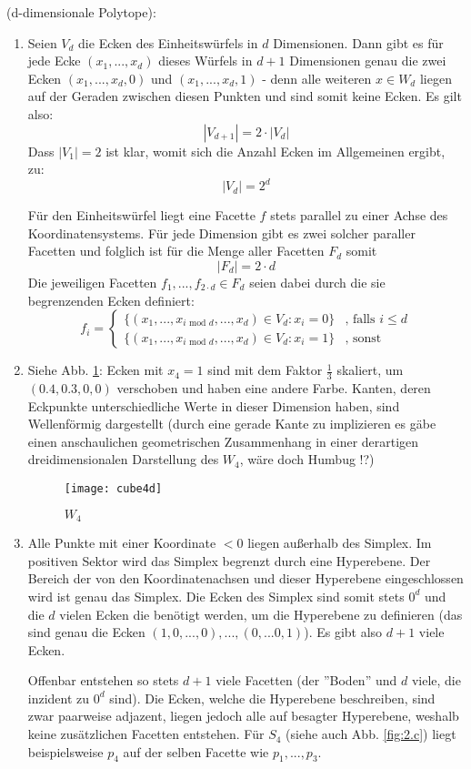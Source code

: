 \documentclass[a4paper, titlepage=false, parskip=full-, 10pt]{scrartcl}
\newcounter{tasknbr}
\newenvironment{task}[1]{{\bf Aufgabe \arabic {tasknbr}\stepcounter{tasknbr}} (#1):\begin{enumerate}}{\end{enumerate}}
\newcommand{\subtask}[1]{\item[#1)]}
\begin{document}
\begin{task}{d-dimensionale Polytope}
\subtask{a}
Seien $V_d$ die Ecken des Einheitswürfels in $d$ Dimensionen. Dann gibt es für jede Ecke $(x_1,...,x_d)$ dieses Würfels in $d+1$ Dimensionen genau die zwei Ecken $(x_1,...,x_d,0)$ und $(x_1,...,x_d,1)$ - denn alle weiteren $x\in W_d$ liegen auf der Geraden zwischen diesen Punkten und sind somit keine Ecken. Es gilt also:
$$|V_{d+1}|=2\cdot |V_d|$$
Dass $|V_1|=2$ ist klar, womit sich die Anzahl Ecken im Allgemeinen ergibt, zu:
$$|V_d|=2^d$$ 

Für den Einheitswürfel liegt eine Facette $f$ stets parallel zu einer Achse des Koordinatensystems. Für jede Dimension gibt es zwei solcher paraller Facetten und folglich ist für die Menge aller Facetten $F_d$ somit
$$|F_d|=2\cdot d$$
Die jeweiligen Facetten $f_1,...,f_{2\cdot d}\in F_d$ seien dabei durch die sie begrenzenden Ecken definiert:
$$f_i=\begin{cases}
\{ (x_1,...,x_{i\text{ mod } d},...,x_d)\in V_d:x_i=0\}&\text{, falls }i\le d\\
\{ (x_1,...,x_{i\text{ mod }d},...,x_d)\in V_d:x_i=1\}&\text{, sonst}
\end{cases}$$

\subtask{b}
Siehe Abb. \ref{fig:2.b}: Ecken mit $x_4=1$ sind mit dem Faktor $\frac{1}{3}$ skaliert, um $(0.4,0.3,0,0)$ verschoben und haben eine andere Farbe. Kanten, deren Eckpunkte unterschiedliche Werte in dieser Dimension haben, sind Wellenförmig dargestellt (durch eine gerade Kante zu implizieren es gäbe einen anschaulichen geometrischen Zusammenhang in einer derartigen dreidimensionalen Darstellung des $W_4$, wäre doch Humbug !?)

\begin{figure}[h!]
\begin{center}
\texttt{[image: cube4d]}
\end{center}
\caption{$W_4$}
\label{fig:2.b}
\end{figure}

\subtask{c}
Alle Punkte mit einer Koordinate $<0$ liegen außerhalb des Simplex. Im positiven Sektor wird das Simplex begrenzt durch eine Hyperebene. Der Bereich der von den Koordinatenachsen und dieser Hyperebene eingeschlossen wird ist genau das Simplex. Die Ecken des Simplex sind somit stets $0^d$ und die $d$ vielen Ecken die benötigt werden, um die Hyperebene zu definieren (das sind genau die Ecken $(1,0,...,0),...,(0,...0,1)$). Es gibt also $d+1$ viele Ecken.

Offenbar entstehen so stets $d+1$ viele Facetten (der ''Boden'' und $d$ viele, die inzident zu $0^d$ sind). Die Ecken, welche die Hyperebene beschreiben, sind zwar paarweise adjazent, liegen jedoch alle auf besagter Hyperebene, weshalb keine zusätzlichen Facetten entstehen. Für $S_4$ (siehe auch Abb. \ref{fig:2.c}) liegt beispielsweise $p_4$ auf der selben Facette wie $p_1,...,p_3$.


\end{task}
\end{document}
